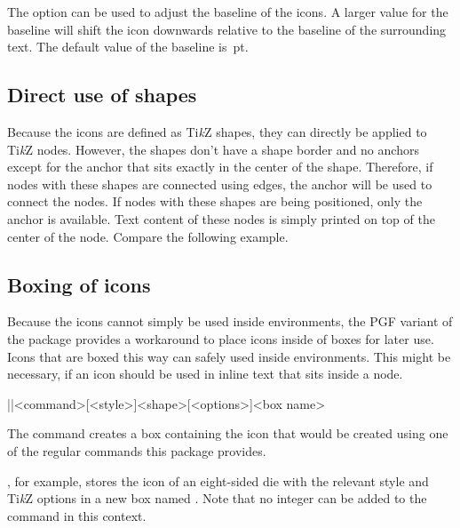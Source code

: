 \documentclass[a4paper]{article}
\begin{document}
The option  can be used to adjust the baseline of the icons. A larger value for the baseline will shift the icon downwards relative to the baseline of the surrounding text. The default value of the baseline is \,pt.

\subsection{Direct use of shapes}

Because the icons are defined as Ti\emph{k}Z shapes, they can directly be applied to Ti\emph{k}Z nodes. However, the shapes don't have a shape border and no anchors except for the  anchor that sits exactly in the center of the shape. Therefore, if nodes with these shapes are connected using edges, the  anchor will be used to connect the nodes. If nodes with these shapes are being positioned, only the  anchor is available. Text content of these nodes is simply printed on top of the center of the node. Compare the following example.

\begin{codeexample}
\end{codeexample}

\subsection{Boxing of icons}

Because the icons cannot simply be used inside  environments, the PGF variant of the package provides a workaround to place icons inside of boxes for later use. Icons that are boxed this way can safely used inside  environments. This might be necessary, if an icon should be used in inline text that sits inside a node.

\begin{macrodef}|\provideprotecteddndicon|{<command>}[<style>]{<shape>}[<options>]{<box name>}\end{macrodef}
The command \macro{\provideprotecteddndicon} creates a box containing the icon that would be created using one of the regular commands this package provides. 

, for example, stores the icon of an eight-sided die with the relevant style and Ti\emph{k}Z options in a new box named . Note that no integer can be added to the  command in this context.
\end{document}
